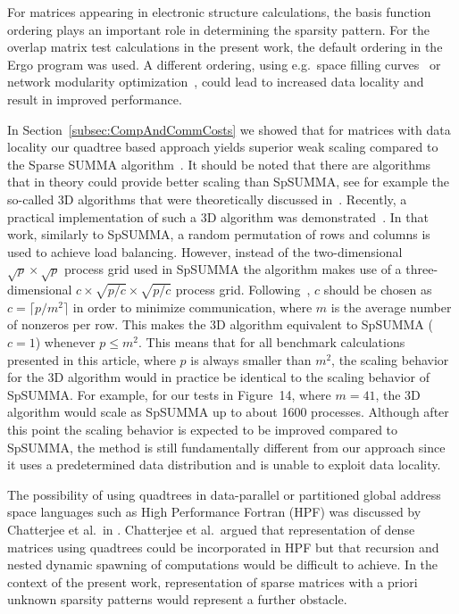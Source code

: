 \documentclass{elsarticle}
\begin{document}
 

For matrices appearing in electronic structure calculations, the basis
function ordering plays an important role in determining the sparsity
pattern. For the overlap matrix test calculations in the present
work, the default ordering in the {\sc Ergo} program was used.
A different ordering, using e.g.~space filling
curves~\cite{Challacombe-sparsematrix} or network modularity
optimization~\cite{Girvan11062002-network,rubensson-inverse-factorization},
could lead to increased data locality and result in improved
performance.

In Section~\ref{subsec:CompAndCommCosts} we showed that for matrices
with data locality our quadtree based approach yields superior weak
scaling compared to the Sparse SUMMA
algorithm~\cite{SparseSUMMA2008}. It should be noted that there are
algorithms that in theory could provide better scaling than SpSUMMA,
see for example the so-called 3D algorithms that were theoretically
discussed in~\cite{communication_optimal_2}.  Recently, a practical
implementation of such a 3D algorithm was
demonstrated~\cite{Azad2015}.  In that work, similarly to SpSUMMA, a
random permutation of rows and columns is used to achieve load
balancing.  However, instead of the two-dimensional $ \sqrt{p} \times
\sqrt{p}$ process grid used in SpSUMMA the algorithm makes use of a
three-dimensional $c \times \sqrt{p/c} \times \sqrt{p/c}$ process grid.
Following~\cite{communication_optimal_2}, $c$ should be chosen as
$c=\lceil p/m^2 \rceil$ in order to minimize communication, where $m$
is the average number of nonzeros per row. This makes the 3D algorithm
equivalent to SpSUMMA ($c = 1$) whenever $p \leq m^2$.  This means
that for all benchmark calculations presented in this article, where
$p$ is always smaller than $m^2$, the scaling behavior for the 3D
algorithm would in practice be identical to the scaling behavior of
SpSUMMA. For example, for our tests in Figure~14, where $m = 41$, the
3D algorithm would scale as SpSUMMA up to about 1600 processes.
Although after this point the scaling behavior is expected to be
improved compared to SpSUMMA, the method is still fundamentally
different from our approach since it uses a predetermined data
distribution and is unable to exploit data locality.

The possibility of using quadtrees in data-parallel or partitioned
global address space languages such as High Performance Fortran (HPF)
was discussed by Chatterjee et al.~in
\cite{ChatterjeeMatMul2002_A}. Chatterjee et al.~argued that
representation of dense matrices using quadtrees could be incorporated
in HPF but that recursion and nested dynamic spawning of computations
would be difficult to achieve. In the context of the present work,
representation of sparse matrices with a priori unknown sparsity
patterns would represent a further obstacle.
\end{document}
